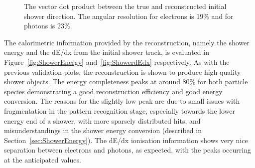 \begin{figure}
\begin{minipage}[t]{0.48\linewidth}
    \caption[The vector dot product between the true and reconstructed initial shower direction.]{The vector dot product between the true and reconstructed initial shower direction.  The angular resolution for electrons is 19\% and for photons is 23\%.}
    \label{fig:ShowerDirection}
  \end{minipage}
\end{figure}

The calorimetric information provided by the reconstruction, namely the shower energy and the dE/dx from the initial shower track, is evaluated in Figure~\ref{fig:ShowerEnergy} and~\ref{fig:ShowerdEdx} respectively.  As with the previous validation plots, the reconstruction is shown to produce high quality shower objects.  The energy completeness peaks at around 80\% for both particle species demonstrating a good reconstruction efficiency and good energy conversion.  The reasons for the slightly low peak are due to small issues with fragmentation in the pattern recognition stage, especially towards the lower energy end of a shower, with more sparsely distributed hits, and misunderstandings in the shower energy conversion (described in Section~\ref{sec:ShowerEnergy}).  The dE/dx ionisation information shows very nice separation between electrons and photons, as expected, with the peaks occurring at the anticipated values.

